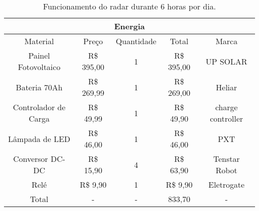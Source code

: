 \begin{table}[H]
\caption{Funcionamento do radar durante 6 horas por dia.}\label{tab:custo2}
\begin{tabular}{|c|c|c|c|c|}
\hline
\multicolumn{5}{|c|}{Energia}                                                 \\ \hline
Material             & Preço         & Quantidade & Total         & Marca     \\ \hline
Painel Fotovoltaico  & R\$ 395,00  & 1          & R\$ 395,00  & UP SOLAR    \\ \hline
Bateria 70Ah              & R\$ 269,99  & 1          & R\$ 269,00  & Heliar  \\ \hline
Controlador de Carga & R\$ 49,99  & 1          & R\$ 49,90  & charge controller \\ \hline
Lâmpada de LED       & R\$ 46,00 & 1          & R\$ 46,00 & PXT         \\ \hline
Conversor DC-DC       & R\$ 15,90 & 4          & R\$ 63,90 & Tenstar Robot         \\ \hline
Relé       & R\$ 9,90 & 1          & R\$ 9,90 & Eletrogate         \\ \hline
Total & - & - & 833,70 & - \\ \hline
\end{tabular}
\end{table}
